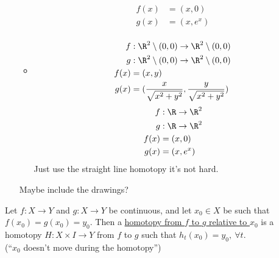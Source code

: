 \begin{itemize}
\begin{itemize}
\begin{align*}
                        f(x)&=(x,0)\\
                        g(x)&=(x,e^x)\\
                    \end{align*}
                \item
                    \begin{align*}
                        f&: \R^2\setminus{(0,0)} \rightarrow \R^2\setminus{(0,0)}\\
                        g&: \R^2\setminus{(0,0)} \rightarrow \R^2\setminus{(0,0)}\\
                        f(x)&=(x,y)\\
                        g(x)&=(\frac{x}{\sqrt{x^2+y^2}},\frac{y}{\sqrt{x^2+y^2}})\\
                    \end{align*}
                    \begin{align*}
                        f&: \R \rightarrow \R^2\\
                        g&: \R \rightarrow \R^2\\
                        f(x)&=(x,0)\\
                        g(x)&=(x,e^x)\\
                    \end{align*}
                    Just use the straight line homotopy it's not hard.
            \end{itemize}
            Maybe include the drawings?
    \end{itemize}
        \begin{definition}
            Let $f:X\rightarrow Y$ and $g: X\rightarrow Y$ be continuous,
            and let $x_0 \in X$ be such that $f(x_0)=g(x_0)=y_0$. Then a
            \underline{homotopy from $f$ to $g$ relative to $x_0$} is a homotopy $H:X\times I \rightarrow Y$
            from $f$ to $g$ such that $h_t(x_0)=y_0,\ \forall t$.\\
            (``$x_0$ doesn't move during the homotopy'')
        \end{definition}
